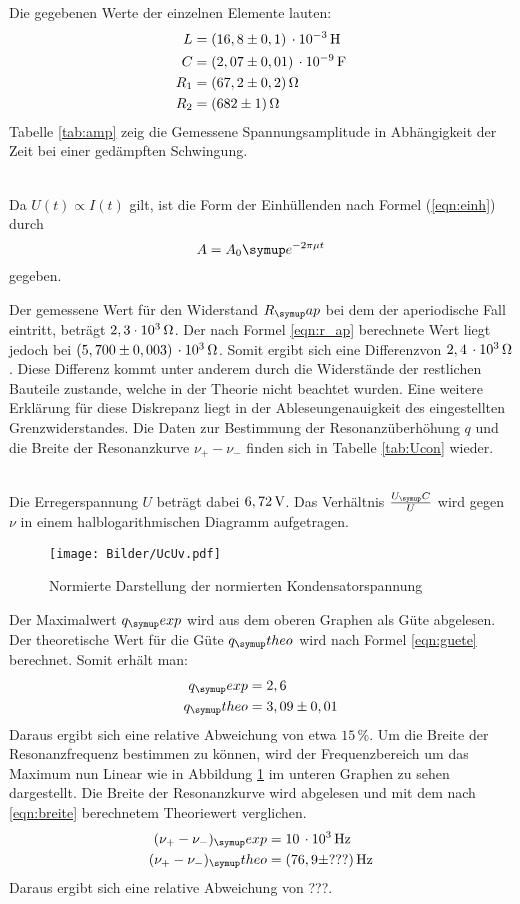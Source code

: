 Die gegebenen Werte der einzelnen Elemente lauten:
\begin{align*}
  L &= (16,8 \pm 0,1) \,\cdot 10^{-3}\Hen \\
  C &= (2,07 \pm 0,01) \,\cdot 10^{-9} \Far \\
  R_1 &= (67,2 \pm 0,2) \Ohm \\
  R_2 &= (682 \pm 1) \Ohm
\end{align*}
Tabelle \ref{tab:amp} zeig die Gemessene Spannungsamplitude in Abhängigkeit der Zeit bei
einer gedämpften Schwingung.

\\
Da $U(t)\propto I(t)$ gilt, ist die Form der Einhüllenden nach Formel
(\ref{eqn:einh}) durch
\begin{equation}
  A = A_0\su{e}^{-2\pi\mu t}
\end{equation}
gegeben.

Der gemessene Wert für den Widerstand $R_\su{ap}$ bei dem der aperiodische Fall
eintritt, beträgt $2,3\cdot 10^3 \,\si{\ohm}$. Der nach Formel \eqref{eqn:r_ap}
berechnete Wert liegt jedoch bei $(5,700 \pm 0,003)\,\cdot 10^3\,\si{\ohm}$. Somit ergibt
sich eine Differenzvon $2,4\,\cdot10^3 \,\si{\ohm}$. Diese Differenz kommt unter anderem durch die Widerstände der
restlichen Bauteile zustande, welche in der Theorie nicht beachtet wurden.
Eine weitere Erklärung für diese Diskrepanz liegt in der Ableseungenauigkeit
des eingestellten Grenzwiderstandes.
\newpage
Die Daten zur Bestimmung der Resonanzüberhöhung $q$ und die Breite der
Resonanzkurve $\nu_+ - \nu_-$ finden sich in Tabelle \ref{tab:Ucon} wieder.

\\
Die Erregerspannung $U$ beträgt dabei $6,72 \,\si{\volt}$.
Das Verhältnis $\frac{U_\su{C}}{U}$ wird gegen $\nu$ in einem halblogarithmischen
Diagramm aufgetragen.
\begin{figure}[h]
  \centering
  \texttt{[image: Bilder/UcUv.pdf]}
  \caption{Normierte Darstellung der normierten Kondensatorspannung}
  \label{fig:UcUv}
\end{figure}
Der Maximalwert $q_\su{exp}$ wird aus dem oberen Graphen als Güte abgelesen. Der
theoretische Wert für die Güte $q_\su{theo}$ wird nach Formel \eqref{eqn:guete} berechnet.
Somit erhält man:
\begin{align*}
  q_\su{exp} &= 2,6 \\
  q_\su{theo} &= 3,09 \pm 0,01
\end{align*}
Daraus ergibt sich eine relative Abweichung von etwa $15\,\si{\percent}$. Um
die Breite der Resonanzfrequenz bestimmen zu können, wird der Frequenzbereich
um das Maximum nun Linear wie in Abbildung \ref{fig:UcUv} im unteren Graphen
zu sehen dargestellt. Die Breite der Resonanzkurve wird abgelesen und mit dem
nach \eqref{eqn:breite} berechnetem Theoriewert verglichen.
\begin{align*}
  (\nu_+ - \nu_-)_\su{exp} &= 10\,\cdot10^3\Hz \\
  (\nu_+ - \nu_-)_\su{theo}&= (76,9 \pm ???)\Hz %
\end{align*}
Daraus ergibt sich eine relative Abweichung von ???.
